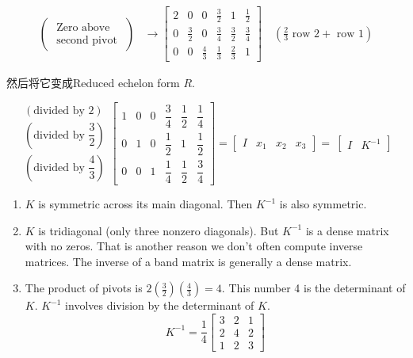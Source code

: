 \begin{example}
\begin{equation}
\begin{aligned}
               \left(\begin{array}{l}\text { Zero above } \\ \text { second pivot }\end{array}\right) & \rightarrow\left[\begin{array}{cccccc}2 & 0 & 0 & \frac{3}{2} & 1 & \frac{1}{2} \\ 0 & \frac{3}{2} & 0 & \frac{3}{4} & \frac{3}{2} & \frac{3}{4} \\ 0 & 0 & \frac{4}{3} & \frac{1}{3} & \frac{2}{3} & 1\end{array}\right] \quad\left(\frac{2}{3} \text{ row } 2+ \text{ row }1 \right)
        \end{aligned} \end{equation}


    然后将它变成Reduced echelon form $R$.

   
    $$ \begin{matrix}
                (\text{divided by }2)                      \\
                \left(\text{divided by }\dfrac{3}{2}\right) \\
                \left(\text{divided by }\dfrac{4}{3}\right)
            \end{matrix}\left[\begin{matrix}
                    1 & 0 & 0 & \dfrac{3}{4} & \dfrac{1}{2} & \dfrac{1}{4} \\
                    0 & 1 & 0 & \dfrac{1}{2} & 1           & \dfrac{1}{2} \\
                    0 & 0 & 1 & \dfrac{1}{4} & \dfrac{1}{2} & \dfrac{3}{4}
                \end{matrix}\right] =\left[\begin{matrix}
                    I & x_{1} & x_{2} & x_{3}
                \end{matrix}\right] =\ \left[\begin{matrix}
                    I & K^{-1}
                \end{matrix}\right]$$
    


    \begin{enumerate}
        \item $ K $ is symmetric across its main diagonal. Then $ K^{-1} $ is also symmetric.
        \item $ K $ is tridiagonal (only three nonzero diagonals). But $ K^{-1} $ is a dense matrix with no zeros. That is another reason we don't often compute inverse matrices. The inverse of a band matrix is generally a dense matrix.
        \item The product of pivots is $ 2\left(\frac{3}{2}\right)\left(\frac{4}{3}\right)=4 $. This number 4 is the determinant of $ K $. $ K^{-1} $ involves division by the determinant of $ K $.
        $$ K^{-1}=\frac{1}{4}\left[\begin{array}{lll}3 & 2 & 1 \\ 2 & 4 & 2 \\ 1 & 2 & 3\end{array}\right] $$
    \end{enumerate}



\end{example}
